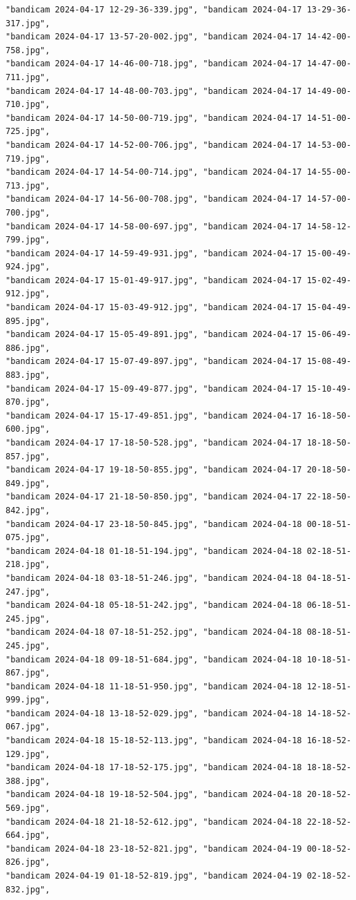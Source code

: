 \documentclass[11pt]{article}
\begin{document}
\begin{verbatim}
"bandicam 2024-04-17 12-29-36-339.jpg", "bandicam 2024-04-17 13-29-36-317.jpg",
"bandicam 2024-04-17 13-57-20-002.jpg", "bandicam 2024-04-17 14-42-00-758.jpg",
"bandicam 2024-04-17 14-46-00-718.jpg", "bandicam 2024-04-17 14-47-00-711.jpg",
"bandicam 2024-04-17 14-48-00-703.jpg", "bandicam 2024-04-17 14-49-00-710.jpg",
"bandicam 2024-04-17 14-50-00-719.jpg", "bandicam 2024-04-17 14-51-00-725.jpg",
"bandicam 2024-04-17 14-52-00-706.jpg", "bandicam 2024-04-17 14-53-00-719.jpg",
"bandicam 2024-04-17 14-54-00-714.jpg", "bandicam 2024-04-17 14-55-00-713.jpg",
"bandicam 2024-04-17 14-56-00-708.jpg", "bandicam 2024-04-17 14-57-00-700.jpg",
"bandicam 2024-04-17 14-58-00-697.jpg", "bandicam 2024-04-17 14-58-12-799.jpg",
"bandicam 2024-04-17 14-59-49-931.jpg", "bandicam 2024-04-17 15-00-49-924.jpg",
"bandicam 2024-04-17 15-01-49-917.jpg", "bandicam 2024-04-17 15-02-49-912.jpg",
"bandicam 2024-04-17 15-03-49-912.jpg", "bandicam 2024-04-17 15-04-49-895.jpg",
"bandicam 2024-04-17 15-05-49-891.jpg", "bandicam 2024-04-17 15-06-49-886.jpg",
"bandicam 2024-04-17 15-07-49-897.jpg", "bandicam 2024-04-17 15-08-49-883.jpg",
"bandicam 2024-04-17 15-09-49-877.jpg", "bandicam 2024-04-17 15-10-49-870.jpg",
"bandicam 2024-04-17 15-17-49-851.jpg", "bandicam 2024-04-17 16-18-50-600.jpg",
"bandicam 2024-04-17 17-18-50-528.jpg", "bandicam 2024-04-17 18-18-50-857.jpg",
"bandicam 2024-04-17 19-18-50-855.jpg", "bandicam 2024-04-17 20-18-50-849.jpg",
"bandicam 2024-04-17 21-18-50-850.jpg", "bandicam 2024-04-17 22-18-50-842.jpg",
"bandicam 2024-04-17 23-18-50-845.jpg", "bandicam 2024-04-18 00-18-51-075.jpg",
"bandicam 2024-04-18 01-18-51-194.jpg", "bandicam 2024-04-18 02-18-51-218.jpg",
"bandicam 2024-04-18 03-18-51-246.jpg", "bandicam 2024-04-18 04-18-51-247.jpg",
"bandicam 2024-04-18 05-18-51-242.jpg", "bandicam 2024-04-18 06-18-51-245.jpg",
"bandicam 2024-04-18 07-18-51-252.jpg", "bandicam 2024-04-18 08-18-51-245.jpg",
"bandicam 2024-04-18 09-18-51-684.jpg", "bandicam 2024-04-18 10-18-51-867.jpg",
"bandicam 2024-04-18 11-18-51-950.jpg", "bandicam 2024-04-18 12-18-51-999.jpg",
"bandicam 2024-04-18 13-18-52-029.jpg", "bandicam 2024-04-18 14-18-52-067.jpg",
"bandicam 2024-04-18 15-18-52-113.jpg", "bandicam 2024-04-18 16-18-52-129.jpg",
"bandicam 2024-04-18 17-18-52-175.jpg", "bandicam 2024-04-18 18-18-52-388.jpg",
"bandicam 2024-04-18 19-18-52-504.jpg", "bandicam 2024-04-18 20-18-52-569.jpg",
"bandicam 2024-04-18 21-18-52-612.jpg", "bandicam 2024-04-18 22-18-52-664.jpg",
"bandicam 2024-04-18 23-18-52-821.jpg", "bandicam 2024-04-19 00-18-52-826.jpg",
"bandicam 2024-04-19 01-18-52-819.jpg", "bandicam 2024-04-19 02-18-52-832.jpg",

\end{verbatim}
\end{document}
